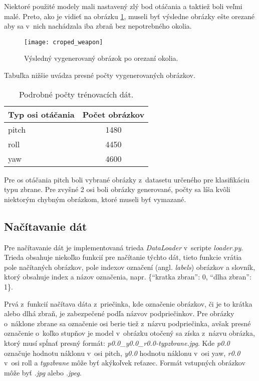 Niektoré použité modely mali nastavený zlý bod otáčania a taktiež boli veľmi malé.
Preto, ako je vidieť na obrázku \ref{pic:generator3d}, museli byť výsledne obrázky ešte orezané aby sa v~nich nachádzala iba zbraň bez nepotrebného okolia.

\begin{figure}[H]
    \centering
    \texttt{[image: croped\_weapon]}
    \caption{Výsledný vygenerovaný obrázok po orezaní okolia.}
    \label{pic:generator3d}
\end{figure}

Tabuľka nižšie uvádza presné počty vygenerovaných obrázkov.

\begin{table}[H]
    \centering
    \label{my-label}
    \begin{tabular}{|l|c|}
        \hline
        Typ osi otáčania & \multicolumn{1}{l|}{Počet obrázkov} \\ \hline
        pitch            & 1480                                \\ \hline
        roll             & 4450                                \\ \hline
        yaw              & 4600                                \\ \hline
        \end{tabular}
    \caption{Podrobné počty trénovacích dát.}
\end{table}

Pre os otáčania pitch boli vybrané obrázky z~datasetu určeného pre klasifikáciu typu zbrane.
Pre zvyšné 2 osi boli obrázky generované, počty sa líša kvôli niektorým chybným obrázkom, ktoré museli byť vymazané.

\subsection{Načítavanie dát}
\label{subsec:nacitaniedat}
Pre načítavanie dát je implementovaná trieda \textit{DataLoader} v~scripte \textit{loader.py}.
Trieda obsahuje niekoľko funkcií pre načítanie týchto dát, tieto funkcie vrátia pole načítaných obrázkov, pole indexov označení (angl. \textit{labels}) obrázkov a
    slovník, ktorý obsahuje index a názov označenia, napr. \{``kratka zbran'': 0, ``dlha zbran'': 1\}.

Prvá z~funkcií načítava dáta z~priečinka, kde označenie obrázkov, či je to krátka alebo dlhá zbraň, je zabezpečené podľa názvov podpriečinkov.
Pre obrázky o~náklone zbrane sa označenie osi berie tiež z~názvu podpriečinka, avšak presné označenie o~koľko stupňov je model v~obrázku otočený
    sa získa z~názvu obrázka, ktorý musí spĺnať presný formát: \textit{p0.0\_y0.0\_r0.0-typzbrane.jpg}.
Kde \textit{p0.0} označuje hodnotu náklonu v~osi pitch, \textit{y0.0} hodnotu náklonu v~osi yaw, \textit{r0.0} v~osi roll a \textit{typzbrane} môže byť
    akýkoľvek reťazec.
Formát vstupných obrázkov môže byť \textit{.jpg} alebo \textit{.jpeg}.

